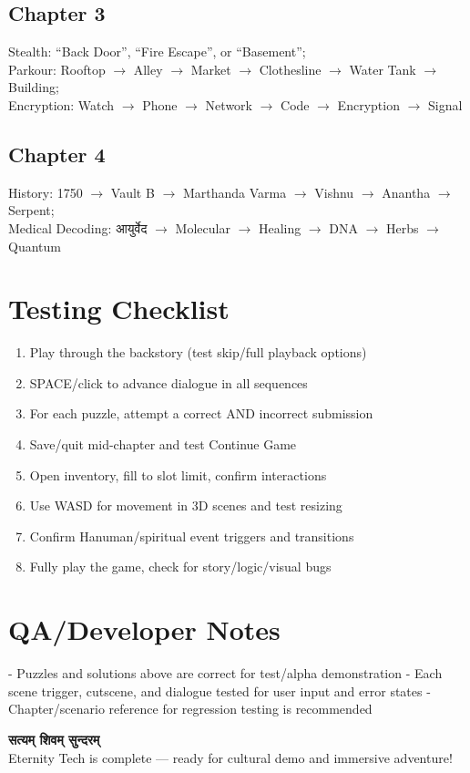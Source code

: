 \documentclass[12pt]{article}
\begin{document}
\subsection*{Chapter 3}
Stealth: ``Back Door'', ``Fire Escape'', or ``Basement''; \\ Parkour: Rooftop $\rightarrow$ Alley $\rightarrow$ Market $\rightarrow$ Clothesline $\rightarrow$ Water Tank $\rightarrow$ Building; \\ Encryption: Watch $\rightarrow$ Phone $\rightarrow$ Network $\rightarrow$ Code $\rightarrow$ Encryption $\rightarrow$ Signal

\subsection*{Chapter 4}
History: 1750 $\rightarrow$ Vault B $\rightarrow$ Marthanda Varma $\rightarrow$ Vishnu $\rightarrow$ Anantha $\rightarrow$ Serpent;\\
Medical Decoding: आयुर्वेद $\rightarrow$ Molecular $\rightarrow$ Healing $\rightarrow$ DNA $\rightarrow$ Herbs $\rightarrow$ Quantum


\section{Testing Checklist}
\begin{enumerate}[leftmargin=1.5em]
  \item Play through the backstory (test skip/full playback options)
  \item SPACE/click to advance dialogue in all sequences
  \item For each puzzle, attempt a correct AND incorrect submission
  \item Save/quit mid-chapter and test Continue Game
  \item Open inventory, fill to slot limit, confirm interactions
  \item Use WASD for movement in 3D scenes and test resizing
  \item Confirm Hanuman/spiritual event triggers and transitions
  \item Fully play the game, check for story/logic/visual bugs
\end{enumerate}

\section{QA/Developer Notes}
- Puzzles and solutions above are correct for test/alpha demonstration
- Each scene trigger, cutscene, and dialogue tested for user input and error states
- Chapter/scenario reference for regression testing is recommended

\bigskip
\noindent
\textbf{सत्यम् शिवम् सुन्दरम्}\\
Eternity Tech is complete — ready for cultural demo and immersive adventure!
\end{document}
